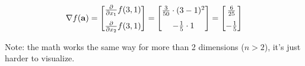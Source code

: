 \documentclass{article}
\begin{document}
            \begin{align*}
              \nabla f(\mathbf{a})
                = \begin{bmatrix}
                    \vspace{1.5ex}
                    \frac{\partial}{\partial x_1} f(3, 1) \\
                    \frac{\partial}{\partial x_2} f(3, 1)
                  \end{bmatrix}
                = \begin{bmatrix}
                    \vspace{1.5ex}
                    \frac{3}{50} \cdot (3 - 1)^2 \\
                    - \frac{1}{5} \cdot 1
                  \end{bmatrix}
                = \begin{bmatrix}
                    \vspace{1.5ex}
                    \frac{6}{25} \\
                    - \frac{1}{5}
                  \end{bmatrix}
            \end{align*}

            Note: the math works the same way for more than 2 dimensions
            ($n > 2$), it's just harder to visualize.
\end{document}
